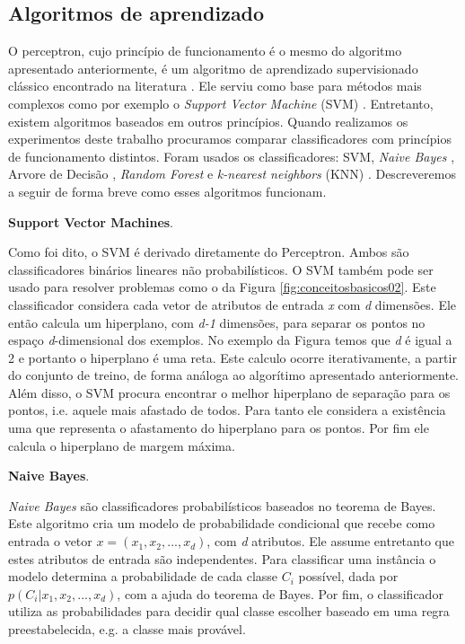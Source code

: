 \subsection{Algoritmos de aprendizado}

O perceptron, cujo princípio de funcionamento é o mesmo do algoritmo apresentado anteriormente, é um algoritmo de aprendizado supervisionado clássico encontrado na literatura \cite{Rosenblatt}.
Ele serviu como base para métodos mais complexos como por exemplo o \textit{Support Vector Machine} (SVM) \cite{Chang}.
Entretanto, existem algoritmos baseados em outros princípios.
Quando realizamos os experimentos deste trabalho procuramos comparar classificadores com princípios de funcionamento distintos.
Foram usados os classificadores: SVM, \textit{Naive Bayes} \cite{Murphy}, Arvore de Decisão \cite{Quinlan}, \textit{Random Forest} \cite{Breiman} e \textit{k-nearest neighbors} (KNN) \cite{Duda}.
Descreveremos a seguir de forma breve como esses algoritmos funcionam.

\textbf{Support Vector Machines}.

Como foi dito, o SVM é derivado diretamente do Perceptron.
Ambos são classificadores binários lineares não probabilísticos.
O SVM também pode ser usado para resolver problemas como o da Figura \ref{fig:conceitosbasicos02}.
Este classificador considera cada vetor de atributos de entrada \textit{x} com \textit{d} dimensões.
Ele então calcula um hiperplano, com \textit{d-1} dimensões, para separar os pontos no espaço \textit{d}-dimensional dos exemplos.
No exemplo da Figura temos que \textit{d} é igual a 2 e portanto o hiperplano é uma reta.
Este calculo ocorre iterativamente, a partir do conjunto de treino, de forma análoga ao algorítimo apresentado anteriormente.
Além disso, o SVM procura encontrar o melhor hiperplano de separação para os pontos, i.e. aquele mais afastado de todos. 
Para tanto ele considera a existência uma  que representa o afastamento do hiperplano para os pontos.
Por fim ele calcula o hiperplano de margem máxima.

\textbf{Naive Bayes}.

\textit{Naive Bayes} são classificadores probabilísticos baseados no teorema de Bayes.
Este algoritmo cria um modelo de probabilidade condicional que recebe como entrada o vetor $ \textit{x} = (x_1, x_2, ... , x_d) $, com \textit{d} atributos.
Ele assume entretanto que estes atributos de entrada são independentes.
Para classificar uma instância o modelo determina a probabilidade de cada classe $C_i$ possível, dada por $p(C_i|x_1, x_2, ... , x_d)$, com a ajuda do teorema de Bayes.
Por fim, o classificador utiliza as probabilidades para decidir qual classe escolher baseado em uma regra preestabelecida, e.g. a classe mais provável.

